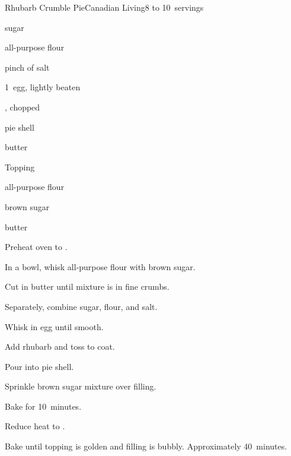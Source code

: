 \begin{recipe}{Rhubarb Crumble Pie}{Canadian Living}{8 to 10~servings}

\begin{ingredients}
\item \C{1\quarter} sugar
\item {} all-purpose flour
\item pinch of salt
\item 1~egg, lightly beaten
\item {} , chopped
\item pie shell
\item {} butter
\end{ingredients}

Topping
\begin{ingredients}
\item \C{\threequarter} all-purpose flour
\item \C{\third} brown sugar
\item \C{\third} butter
\end{ingredients}

\begin{directions}
\item Preheat oven to .
\item In a bowl, whisk \C{\threequarter} all-purpose flour with brown sugar.
\item Cut in \C{\third} butter until mixture is in fine crumbs.
\item Separately, combine sugar,  flour, and salt.
\item Whisk in egg until smooth.
\item Add rhubarb and toss to coat.
\item Pour into pie shell.
\item Sprinkle brown sugar mixture over filling.
\item Bake for 10~minutes.
\item Reduce heat to .
\item Bake until topping is golden and filling is bubbly. Approximately 40~minutes.  
\end{directions}

\end{recipe}
